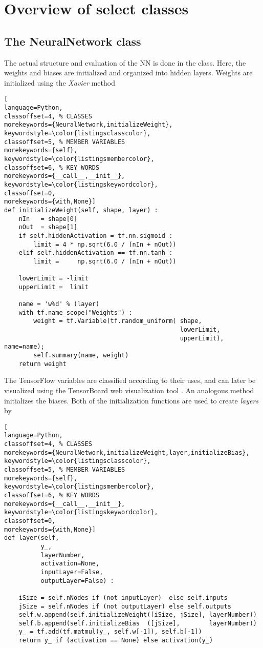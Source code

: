 \documentclass[../../master.tex]{subfiles}
\begin{document}
\section{Overview of select classes}
\subsection{The NeuralNetwork class}
The actual structure and evaluation of the NN is done in the  class. Here, the weights and biases are initialized and organized into hidden layers. Weights are initialized using the \emph{Xavier} method \cite{glorot2010understanding}
\begin{lstlisting}[
language=Python,
classoffset=4, % CLASSES
morekeywords={NeuralNetwork,initializeWeight},
keywordstyle=\color{listingsclasscolor},
classoffset=5, % MEMBER VARIABLES
morekeywords={self},
keywordstyle=\color{listingsmembercolor},
classoffset=6, % KEY WORDS
morekeywords={__call__,__init__},
keywordstyle=\color{listingskeywordcolor},
classoffset=0,
morekeywords={with,None}]
def initializeWeight(self, shape, layer) :
    nIn   = shape[0]
    nOut  = shape[1]
    if self.hiddenActivation = tf.nn.sigmoid :
        limit = 4 * np.sqrt(6.0 / (nIn + nOut))
    elif self.hiddenActivation == tf.nn.tanh :
        limit =     np.sqrt(6.0 / (nIn + nOut))
      
    lowerLimit = -limit
    upperLimit =  limit

    name = 'w%d' % (layer)
    with tf.name_scope("Weights") :
        weight = tf.Variable(tf.random_uniform( shape, 
                                                lowerLimit, 
                                                upperLimit), name=name); 
        self.summary(name, weight)
    return weight
\end{lstlisting}
The TensorFlow variables are classified according to their uses, and can later be visualized using the TensorBoard web visualization tool \cite{tensorboard}. An analogous method initializes the biases. Both of the initialization functions are used to create \emph{layers} by
\begin{lstlisting}[
language=Python,
classoffset=4, % CLASSES
morekeywords={NeuralNetwork,initializeWeight,layer,initializeBias},
keywordstyle=\color{listingsclasscolor},
classoffset=5, % MEMBER VARIABLES
morekeywords={self},
keywordstyle=\color{listingsmembercolor},
classoffset=6, % KEY WORDS
morekeywords={__call__,__init__},
keywordstyle=\color{listingskeywordcolor},
classoffset=0,
morekeywords={with,None}]
def layer(self, 
          y_,
          layerNumber, 
          activation=None, 
          inputLayer=False, 
          outputLayer=False) :

    iSize = self.nNodes if (not inputLayer)  else self.inputs
    jSize = self.nNodes if (not outputLayer) else self.outputs
    self.w.append(self.initializeWeight([iSize, jSize], layerNumber))
    self.b.append(self.initializeBias  ([jSize],        layerNumber))
    y_ = tf.add(tf.matmul(y_, self.w[-1]), self.b[-1])
    return y_ if (activation == None) else activation(y_)
\end{lstlisting}
\end{document}
